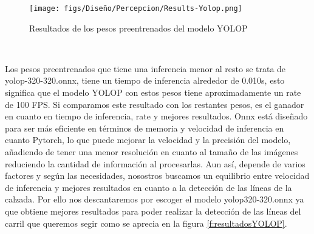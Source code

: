 \begin{figure} [H]
  \begin{center}
    \texttt{[image: figs/Diseño/Percepcion/Results-Yolop.png]}
  \end{center}
  \caption{Resultados de los pesos preentrenados del modelo YOLOP}
  \label{fig:resultados_pesos_preentrenados}
\end{figure}\

Los pesos preentrenados que tiene una inferencia menor al resto se trata de yolop-320-320.onnx, tiene un tiempo de inferencia alrededor de 0.010s, esto
significa que el modelo YOLOP con estos pesos tiene aproximadamente un rate de 100 FPS. Si comparamos este resultado con los restantes pesos, es el ganador en cuanto 
en tiempo de inferencia, rate y mejores resultados. 
Onnx está diseñado para ser más eficiente en términos de memoria y velocidad de inferencia en cuanto Pytorch, lo que puede mejorar la velocidad y la precisión
del modelo, añadiendo de tener una menor resolución en cuanto al tamaño de las imágenes reduciendo la cantidad de información al procesarlas. Aun así, depende de varios factores y según las necesidades, nosostros
buscamos un equilibrio entre velocidad de inferencia y mejores resultados en cuanto a la detección de las líneas de la calzada. 
Por ello nos descantaremos por escoger el modelo yolop320-320.onnx ya que obtiene mejores resultados para poder realizar la detección de las líneas del carril que 
queremos segir como se aprecia en la figura \ref{f:resultadosYOLOP}.\newline

